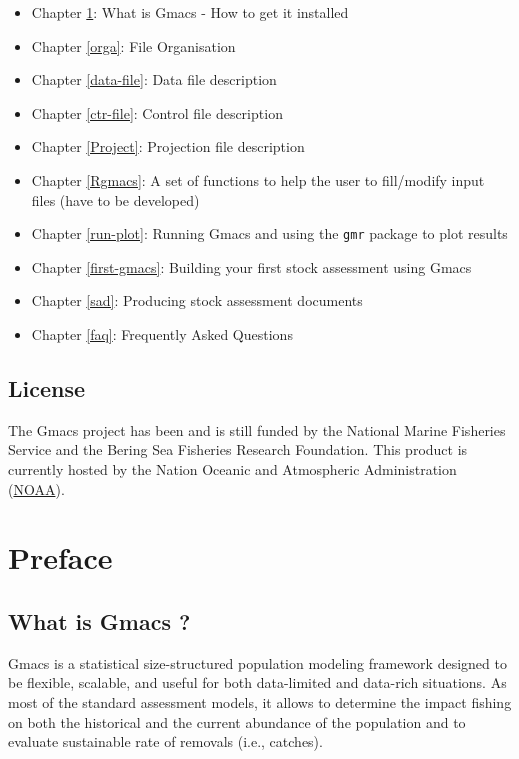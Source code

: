 \documentclass[
]{book}
\providecommand{\tightlist}{%
  \setlength{\itemsep}{0pt}\setlength{\parskip}{0pt}}
\begin{document}
\begin{itemize}
\tightlist
\item
  Chapter \ref{Preface}: What is Gmacs - How to get it installed
\item
  Chapter \ref{orga}: File Organisation
\item
  Chapter \ref{data-file}: Data file description
\item
  Chapter \ref{ctr-file}: Control file description
\item
  Chapter \ref{Project}: Projection file description
\item
  Chapter \ref{Rgmacs}: A set of functions to help the user to fill/modify input files (have to be developed)
\item
  Chapter \ref{run-plot}: Running Gmacs and using the \texttt{gmr} package to plot results
\item
  Chapter \ref{first-gmacs}: Building your first stock assessment using Gmacs
\item
  Chapter \ref{sad}: Producing stock assessment documents
\item
  Chapter \ref{faq}: Frequently Asked Questions
\end{itemize}

\hypertarget{license}{%
\section*{License}\label{license}}

The Gmacs project has been and is still funded by the National Marine Fisheries Service and the Bering Sea Fisheries Research Foundation. This product is currently hosted by the Nation Oceanic and Atmospheric Administration (\href{https://www.noaa.gov/}{NOAA}).

\hypertarget{Preface}{%
\chapter{Preface}\label{Preface}}

\hypertarget{what-is-gmacs}{%
\section*{What is Gmacs ?}\label{what-is-gmacs}}

Gmacs is a statistical size-structured population modeling framework designed to be flexible, scalable, and useful for both data-limited and data-rich situations. As most of the standard assessment models, it allows to determine the impact fishing on both the historical and the current abundance of the population and to evaluate sustainable rate of removals (i.e., catches).
\end{document}
